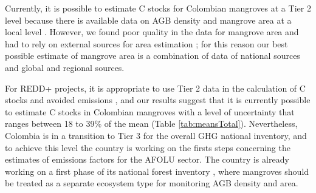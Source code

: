 \documentclass[review, authoryear]{elsarticle}   	%
\begin{document}

Currently, it is possible to estimate C stocks for Colombian mangroves at a Tier 2 level because there is available data on AGB density and mangrove area at a local level \citep{IPCC2003, IPCC2006}. However, we found poor quality in the data for mangrove area and had to rely on external sources for area estimation \citep[e.g.][]{Giri2011}; for this reason our best possible estimate of mangrove area is a combination of data of national sources and global and regional sources. 


For REDD+ projects, it is appropriate to use Tier 2 data in the calculation of C stocks and avoided emissions \citep{Maniatis2010}, and our results suggest that it is currently possible to estimate C stocks in Colombian mangroves with a level of uncertainty that ranges between 18 to 39\% of the mean (Table \ref{tab:meansTotal}).
Nevertheless, Colombia is in a transition to Tier 3 for the overall GHG national inventory, and to achieve this level the country is working on the firsts steps concerning the estimates of emissions factors for the AFOLU sector. The country is already working on a first phase of its national forest inventory \citep{IDEAM2015}, where mangroves should be treated as a separate ecosystem type for monitoring AGB density and area. 
\end{document}
